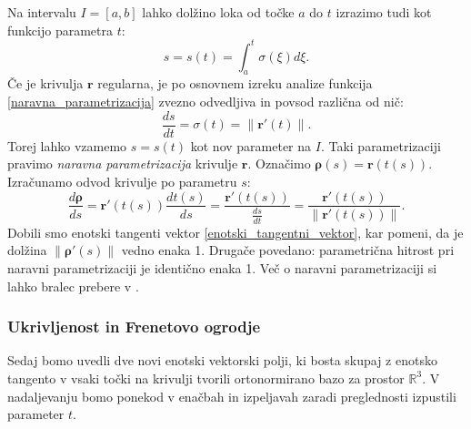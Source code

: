 \documentclass[12pt,a4paper,twoside]{article}
\theoremstyle{definition} %
\theoremstyle{plain} %
\theoremstyle{primerstyle}
\numberwithin{equation}{section}  %
\newcommand{\R}{\mathbb R}
\newcommand{\rV}{\mathbf{r}}
\newcommand{\brho}{\boldsymbol \rho}
\begin{document}
Na intervalu $I=[a,b]$ lahko dolžino loka od točke $a$ do $t$ izrazimo tudi kot funkcijo parametra $t$:
\begin{equation}
	\label{naravna_parametrizacija}
	s=s(t)=\int_a^t\sigma(\xi)d\xi.
\end{equation}
Če je krivulja $\rV$ regularna, je po osnovnem izreku analize funkcija \eqref{naravna_parametrizacija} zvezno odvedljiva in povsod različna od nič:
$$\frac{ds}{dt}=\sigma(t)=\lVert\rV'(t)\rVert.$$
Torej lahko vzamemo $s=s(t)$ kot nov parameter na $I.$ Taki parametrizaciji pravimo \emph{naravna parametrizacija} krivulje $\rV.$ Označimo $\brho(s)=\rV(t(s)).$ Izračunamo odvod krivulje po parametru $s$:
$$\frac{d\brho}{ds}=\rV'(t(s))\frac{dt(s)}{ds}=\frac{\rV'(t(s))}{\frac{ds}{dt}}=\frac{\rV'(t(s))}{\lVert\rV'(t(s))\rVert}.$$
Dobili smo enotski tangenti vektor \eqref{enotski_tangentni_vektor}, kar pomeni, da je dolžina $\lVert\brho'(s)\rVert$ vedno enaka 1. Drugače povedano: parametrična hitrost pri naravni parametrizaciji je identično enaka 1. Več o naravni parametrizaciji si lahko bralec prebere v \cite[str. 51]{lipschutz1969schaum}.

\subsubsection{Ukrivljenost in Frenetovo ogrodje}

Sedaj bomo uvedli dve novi enotski vektorski polji, ki bosta skupaj z enotsko tangento v vsaki točki na krivulji tvorili ortonormirano bazo za prostor $\R^3.$ V nadaljevanju bomo ponekod v enačbah in izpeljavah zaradi preglednosti izpustili parameter $t.$
\end{document}
